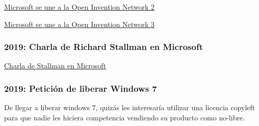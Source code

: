 \href{https://www.zdnet.com/article/what-does-microsoft-joining-the-open-invention-network-mean-for-you/}{Microsoft se une a la Open Invention Network 2}

\href{https://www.muycomputerpro.com/2018/10/10/microsoft-se-une-a-open-invention-network}{Microsoft se une a la Open Invention Network 3}

\subsubsection{2019: Charla de Richard Stallman en Microsoft}
\href{https://stallman.org/articles/microsoft-talk.html}{Charla de Stallman en Microsoft}

\subsubsection{2019: Petición de liberar Windows 7}
De llegar a liberar windows 7, quizás les interesaría utilizar una licencia copyleft para que nadie les hiciera competencia vendiendo su producto como no-libre.